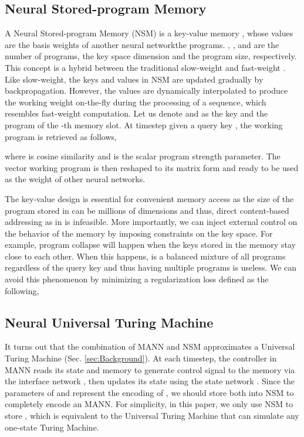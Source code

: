 \documentclass[english]{article}
\renewcommand{\cite}{\citep}
\begin{document}
\subsection{Neural Stored-program Memory}

A Neural Stored-program Memory (NSM) is a key-value memory ,
whose values are the basis weights of another neural networkthe
programs. , , and  are the number of programs, the key
space dimension and the program size, respectively. This concept is
a hybrid between the traditional slow-weight and fast-weight \cite{hinton1987using}.
Like slow-weight, the keys and values in NSM are updated gradually
by backpropagation. However, the values are dynamically interpolated
to produce the working weight on-the-fly during the processing of
a sequence, which resembles fast-weight computation. Let us denote
 and 
as the key and the program of the -th memory slot. At timestep
 given a query key , the working program is retrieved
as follows,






where  is cosine similarity and 
is the scalar program strength parameter. The vector working program
 is then reshaped to its matrix form and ready to be used
as the weight of other neural networks. 

The key-value design is essential for convenient memory access as
the size of the program stored in  can be millions
of dimensions and thus, direct content-based addressing as in \citet{graves2014neural,graves2016hybrid,santoro2016meta}
is infeasible. More importantly, we can inject external control on
the behavior of the memory by imposing constraints on the key space.
For example, program collapse will happen when the keys stored in
the memory stay close to each other. When this happens,  is
a balanced mixture of all programs regardless of the query key and
thus having multiple programs is useless. We can avoid this phenomenon
by minimizing a regularization loss defined as the following,




\subsection{Neural Universal Turing Machine\label{subsec:Neural-Universal-Turing}}

It turns out that the combination of MANN and NSM approximates a Universal
Turing Machine (Sec. \ref{sec:Background}). At each timestep, the
controller in MANN reads its state and memory to generate control
signal to the memory via the interface network , then updates
its state using the state network . Since the parameters of
 and  represent the encoding of , we should
store both into NSM to completely encode an MANN. For simplicity,
in this paper, we only use NSM to store , which is equivalent
to the Universal Turing Machine that can simulate any one-state Turing
Machine. 
\end{document}

